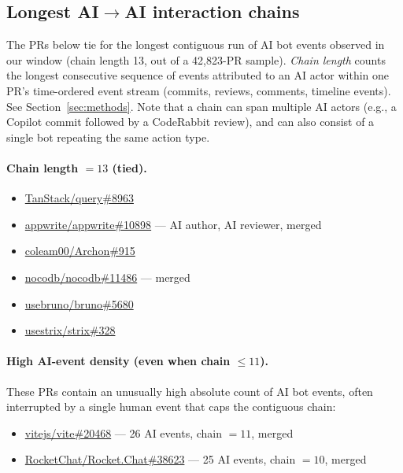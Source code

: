 \subsection{Longest AI$\to$AI interaction chains}
\label{app:examples-chains}

The PRs below tie for the longest contiguous run of AI bot
events observed in our window (chain length 13, out of a 42{,}823-PR
sample). \emph{Chain length} counts the longest consecutive sequence of
events attributed to an AI actor within one PR's time-ordered event
stream (commits, reviews, comments, timeline events). See
Section~\ref{sec:methods}. Note that a chain can span multiple AI
actors (e.g., a Copilot commit followed by a CodeRabbit review), and can
also consist of a single bot repeating the same action type.

\paragraph{Chain length $= 13$ (tied).}
\begin{itemize}\itemsep0pt\parskip0pt
  \item \href{https://github.com/TanStack/query/pull/8963}{TanStack/query\#8963}
  \item \href{https://github.com/appwrite/appwrite/pull/10898}{appwrite/appwrite\#10898} --- AI author, AI reviewer, merged
  \item \href{https://github.com/coleam00/Archon/pull/915}{coleam00/Archon\#915}
  \item \href{https://github.com/nocodb/nocodb/pull/11486}{nocodb/nocodb\#11486} --- merged
  \item \href{https://github.com/usebruno/bruno/pull/5680}{usebruno/bruno\#5680}
  \item \href{https://github.com/usestrix/strix/pull/328}{usestrix/strix\#328}
\end{itemize}

\paragraph{High AI-event density (even when chain $\le 11$).}
These PRs contain an unusually high absolute count of AI bot events, often
interrupted by a single human event that caps the contiguous chain:
\begin{itemize}\itemsep0pt\parskip0pt
  \item \href{https://github.com/vitejs/vite/pull/20468}{vitejs/vite\#20468} --- 26 AI events, chain $=11$, merged
  \item \href{https://github.com/RocketChat/Rocket.Chat/pull/38623}{RocketChat/Rocket.Chat\#38623} --- 25 AI events, chain $=10$, merged
\end{itemize}

